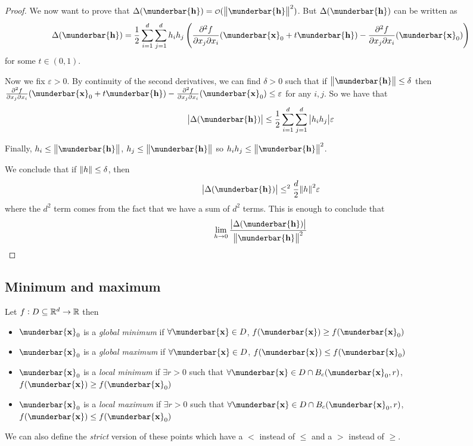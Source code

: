 \documentclass[14pt]{extarticle}
\renewcommand{\vec}[1]{\munderbar{\mathbf{#1}}}
\begin{document}
\begin{proof}
    We now want to prove that $\Delta(\vec h) = \o(\norm {\vec h}^2)$. But $\Delta(\vec h)$ can be written as
    \begin{equation}
        \Delta(\vec h) = \frac{1}{2}  \sum^d_{i = 1} \sum^d_{j = 1} h_i h_j \left( \pdv[2]{f}{x_j}{x_i}()(\vec x_0 + t \vec h)- \pdv[2]{f}{x_j}{x_i}()(\vec x_0)\right)
    \end{equation}
    for some $t \in (0, 1)$.

    Now we fix $\varepsilon > 0$. By continuity of the second derivatives, we can find $\delta > 0$ such that if $\norm {\vec{h}} \leq \delta$ then $ \pdv[2]{f}{x_j}{x_i}()(\vec x_0 + t \vec h)- \pdv[2]{f}{x_j}{x_i}()(\vec x_0) \leq \varepsilon$ for any $i, j$.
    So we have that
    \begin{equation}
        \abs{\Delta(\vec h)} \leq \frac{1}{2}  \sum^d_{i = 1} \sum^d_{j = 1} \abs{h_i h_j} \varepsilon
    \end{equation}

    Finally, $h_i \leq \norm{\vec{h}}$, $h_j \leq \norm{\vec{h}}$ so $h_i h_j \leq \norm{\vec{h}}^2$.

    We conclude that if $\norm{h} \leq \delta$, then
    \begin{equation}
        \abs{\Delta(\vec h)} \leq^2 \frac{d}{2} \norm{h}^2 \varepsilon
    \end{equation}
    where the $d^2$ term comes from the fact that we have a sum of $d^2$ terms.
    This is enough to conclude that
    \begin{equation}
        \lim_{h \to 0} \frac{\abs{\Delta(\vec h)}}{\norm{\vec h}^2}
    \end{equation}
\end{proof}

\subsection{Minimum and maximum}

\begin{definition}
    Let $f: D\subseteq \mathbb{R}^d \to \mathbb{R}$ then
    \begin{itemize}
        \item $\vec x_0$ is a \emph{global minimum} if $\forall \vec x \in D$, $f(\vec x) \geq f(\vec x_0)$
        \item $\vec x_0$ is a \emph{global maximum} if $\forall \vec x \in D$, $f(\vec x) \leq f(\vec x_0)$
        \item $\vec x_0$ is a \emph{local minimum} if $\exists r > 0$ such that $\forall \vec x \in D \cap B_c(\vec x_0, r)$, $f(\vec x) \geq f(\vec x_0)$
        \item $\vec x_0$ is a \emph{local maximum} if $\exists r > 0$ such that $\forall \vec x \in D \cap B_c(\vec x_0, r)$, $f(\vec x) \leq f(\vec x_0)$
    \end{itemize}

    We can also define the \emph{strict} version of these points which have a $<$ instead of $\leq$ and a $>$ instead of $\geq$.
\end{definition}
\end{document}
